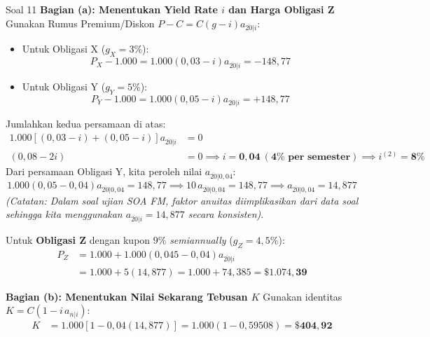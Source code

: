 \documentclass[11pt,a4paper]{article}
\begin{document}
\begin{solutionbox}{Soal 11}
\textbf{Bagian (a): Menentukan Yield Rate $i$ dan Harga Obligasi Z}
Gunakan Rumus Premium/Diskon $P - C = C(g - i)a_{\overline{20}|i}$:
\begin{itemize}
    \item Untuk Obligasi X ($g_X = 3\%$):
    \begin{equation*}
        P_X - 1.000 = 1.000(0{,}03 - i)a_{\overline{20}|i} = -148{,}77
    \end{equation*}
    \item Untuk Obligasi Y ($g_Y = 5\%$):
    \begin{equation*}
        P_Y - 1.000 = 1.000(0{,}05 - i)a_{\overline{20}|i} = +148{,}77
    \end{equation*}
\end{itemize}
Jumlahkan kedua persamaan di atas:
\begin{align*}
    1.000 \left[ (0{,}03 - i) + (0{,}05 - i) \right] a_{\overline{20}|i} &= 0 \\[0.3em]
    (0{,}08 - 2i) &= 0 \implies i = \mathbf{0{,}04 \ (4\% \text{ per semester})} \implies i^{(2)} = \mathbf{8\%}
\end{align*}
Dari persamaan Obligasi Y, kita peroleh nilai $a_{\overline{20}|0{,}04}$:
\begin{equation*}
    1.000(0{,}05 - 0{,}04) a_{\overline{20}|0{,}04} = 148{,}77 \implies 10 \, a_{\overline{20}|0{,}04} = 148{,}77 \implies a_{\overline{20}|0{,}04} = 14{,}877
\end{equation*}
\textit{(Catatan: Dalam soal ujian SOA FM, faktor anuitas diimplikasikan dari data soal sehingga kita menggunakan $a_{\overline{20}|i} = 14{,}877$ secara konsisten)}.

Untuk \textbf{Obligasi Z} dengan kupon $9\%$ \textit{semiannually} ($g_Z = 4{,}5\%$):
\begin{align*}
    P_Z &= 1.000 + 1.000(0{,}045 - 0{,}04) a_{\overline{20}|i} \\
        &= 1.000 + 5(14{,}877) = 1.000 + 74{,}385 = \mathbf{\$1.074{,}39}
\end{align*}

\textbf{Bagian (b): Menentukan Nilai Sekarang Tebusan $K$}
Gunakan identitas $K = C(1 - i \, a_{\overline{n}|i})$:
\begin{align*}
    K &= 1.000 \left[ 1 - 0{,}04(14{,}877) \right] = 1.000(1 - 0{,}59508) = \mathbf{\$404{,}92}
\end{align*}
\end{solutionbox}
\end{document}
